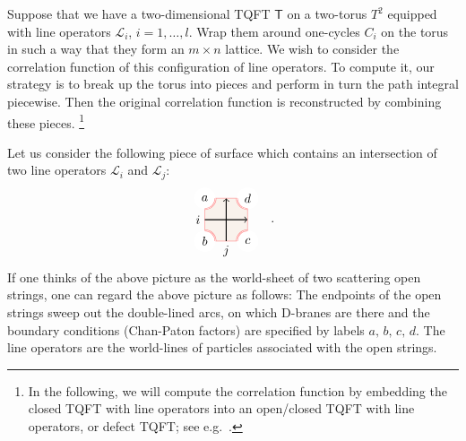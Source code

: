 Suppose that we have a two-dimensional TQFT $\mathsf{T}$ on a two-torus
$T^{2}$ equipped with line operators $\mathcal{L}_{i}$, $i=1,\ldots,l$.
Wrap them around one-cycles $C_{i}$ on the torus in such a way that
they form an $m\times n$ lattice. We wish to consider the correlation
function of this configuration of line operators. To compute it, our
strategy is to break up the torus into pieces and perform in turn
the path integral piecewise. Then the original correlation function
is reconstructed by combining these pieces.%
%
\footnote{In the following, we will compute the correlation function by embedding
the closed TQFT with line operators into an open/closed TQFT with
line operators, or defect TQFT; see e.g.~\cite{Moore:2006dw,Carqueville:2016nqk}. }
%

Let us consider the following piece of surface which contains an intersection
of two line operators $\mathcal{L}_{i}$ and $\mathcal{L}_{j}$: 
\begin{equation}
  \label{eq:piece_of_lines}
    \begin{tikzpicture}[scale=0.6, baseline=(x.base)]
        \node (x) at (0,0) {\vphantom{x}};
        
        \draw[color=red!50, fill=brown!10] (-1,-1) rectangle (1,1);
        
        \fill[color=white] (-1,1) circle (0.5);  \node (a) at (-1,1) {$a$};
        \draw[draw=red!50, double]  (-1,0.5) arc (-90:0:0.5);
        \fill[color=white] (-1,-1) circle (0.5);  \node (b) at (-1,-1) {$b$};
        \draw[draw=red!50, double]  (-1,-0.5) arc (90:0:0.5);
        \fill[color=white] (1,-1) circle (0.5);  \node (c) at (1,-1) {$c$};
        \draw[draw=red!50, double]  (1,-0.5) arc (90:180:0.5);
        \fill[color=white] (1,1) circle (0.5);  \node (d) at (1,1) {$d$};
        \draw[draw=red!50, double]  (1,0.5) arc (-90:-180:0.5);
        
        \draw[thick, ->] (-1,0) node[left] {$i$} -- (1,0);
        \draw[thick, ->] (0,-1) node[below] {$j$} -- (0,1);
        
    \end{tikzpicture}
  \quad .
\end{equation}
 If one thinks of the above picture as the world-sheet of two scattering
open strings, one can regard the above picture as follows: The endpoints
of the open strings sweep out the double-lined arcs, on which D-branes
are there and the boundary conditions (Chan-Paton factors) are specified
by labels $a,\,b,\,c,\,d$. The line operators are the world-lines
of particles associated with the open strings. 


